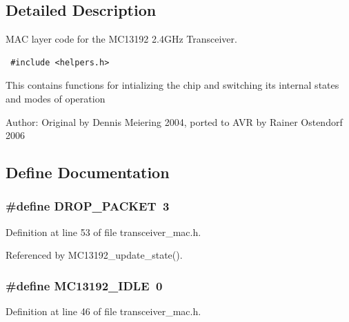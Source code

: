 \subsection{Detailed Description}
MAC layer code for the MC13192 2.4GHz Transceiver. 



\begin{Code}\begin{verbatim} #include <helpers.h> 
\end{verbatim}\end{Code}



This contains functions for intializing the chip and switching its internal states and modes of operation

\begin{Desc}
\item[Author:]Original by Dennis Meiering 2004, ported to AVR by Rainer Ostendorf 2006 \end{Desc}


\subsection{Define Documentation}
\subsubsection{\setlength{\rightskip}{0pt plus 5cm}\#define DROP\_\-PACKET~3}\label{group__ro__transceiver__mac_ge6d21e889b606bda0e96103646e85061}




Definition at line 53 of file transceiver\_\-mac.h.

Referenced by MC13192\_\-update\_\-state().
\subsubsection{\setlength{\rightskip}{0pt plus 5cm}\#define MC13192\_\-IDLE~0}\label{group__ro__transceiver__mac_g1396300cf28dc20aa56390e6782c8530}




Definition at line 46 of file transceiver\_\-mac.h.


